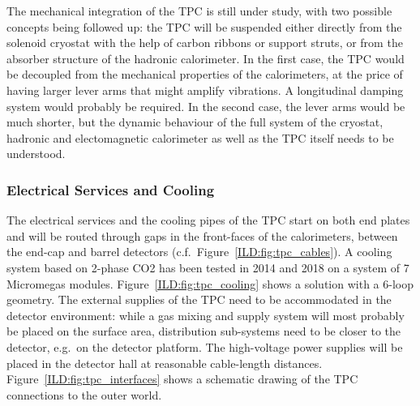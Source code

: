 The mechanical integration of the TPC is still under study, with two possible concepts being followed up: the TPC will be suspended either directly from the solenoid cryostat with the help of carbon ribbons or support struts, or from the absorber structure of the hadronic calorimeter. In the first case, the TPC would be decoupled from the mechanical properties of the calorimeters, at the price of having larger lever arms that might amplify vibrations. A longitudinal damping system would probably be required. In the second case, the lever arms would be much shorter, but the dynamic behaviour of the full system of the cryostat, hadronic and electomagnetic calorimeter as well as the TPC itself needs to be understood. 

\subsubsection{Electrical Services and Cooling}

The electrical services and the cooling pipes of the TPC start on both end plates and will be routed through gaps in the front-faces of the calorimeters, between the end-cap and barrel detectors (c.f.~Figure~\ref{ILD:fig:tpc_cables}). A cooling system based on 2-phase CO2 has been tested in 2014 and 2018 on a system of
7 Micromegas modules. Figure~\ref{ILD:fig:tpc_cooling} shows a solution with a 6-loop geometry. The external supplies of the TPC need to be accommodated in the detector environment: while a gas mixing and supply system will most probably be placed on the surface area, distribution sub-systems need to be closer to the detector, e.g.~on the detector platform. The high-voltage power supplies will be placed in the detector hall at reasonable cable-length distances. Figure~\ref{ILD:fig:tpc_interfaces} shows a schematic drawing of the TPC connections to the outer world.

